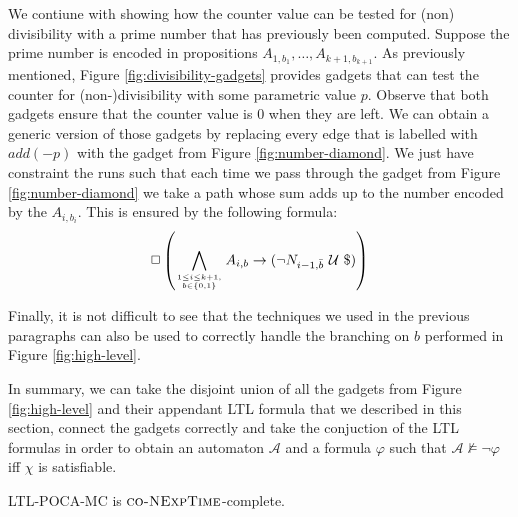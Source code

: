\documentclass{llncs}
\newcommand{\automaton}{\ensuremath{\mathcal{A}}}
\newcommand{\ltlpoca}{\textsc{LTL-POCA-MC} }
\newcommand{\conexptime}{\textsc{co-NExpTime} }
\newcommand{\until}{\ensuremath{\mathcal{~U~}}}
\begin{document}
We contiune with showing how the counter value can be tested for
{(non\-)} divisibility with a prime number that has previously been
computed. Suppose the prime number is encoded in propositions
$A_{1,b_1},\ldots,A_{k+1,b_{k+1}}$. As previously mentioned, Figure
\ref{fig:divisibility-gadgets} provides gadgets that can test the
counter for (non-)divisibility with some parametric value $p$.
Observe that both gadgets ensure that the counter value is $0$ when
they are left. We can obtain a generic version of those gadgets by
replacing every edge that is labelled with $\mathit{add}(-p)$ with the
gadget from Figure \ref{fig:number-diamond}. We just have constraint
the runs such that each time we pass through the gadget from Figure
\ref{fig:number-diamond} we take a path whose sum adds up to the
number encoded by the $A_{i,b_i}$. This is ensured by the following
formula:
\begin{equation*}
  \Box \left( \bigwedge_{1\le i\le k+1,\atop b\in\{0,1\}} A_{i,b}
  \rightarrow (\neg N_{i-1,\bar{b}}\until \$) \right)
\end{equation*}

Finally, it is not difficult to see that the techniques we used in the
previous paragraphs can also be used to correctly handle the branching
on $b$ performed in Figure \ref{fig:high-level}.

In summary, we can take the disjoint union of all the gadgets from
Figure \ref{fig:high-level} and their appendant LTL formula that we
described in this section, connect the gadgets correctly and take the
conjuction of the LTL formulas in order to obtain an automaton
$\automaton$ and a formula $\varphi$ such that $\automaton \not
\models \neg \varphi$ iff $\chi$ is satisfiable.

\begin{theorem}
  \ltlpoca is $\conexptime$-complete.
\end{theorem}



\end{document}
